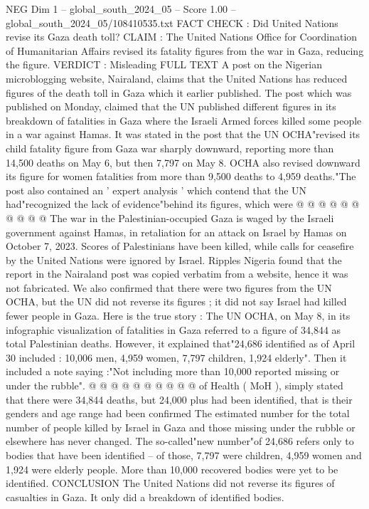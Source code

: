 \begin{textsample}{NEG Dim 1 – global\_south\_2024\_05 – Score 1.00 – global\_south\_2024\_05/108410535.txt}  \label{ex:f1_neg_216}
FACT CHECK : Did United Nations revise its Gaza death toll?
CLAIM : The United Nations Office for Coordination of Humanitarian Affairs revised its fatality figures from the war in Gaza, reducing the figure.
VERDICT : Misleading FULL TEXT A post on the Nigerian microblogging website, Nairaland, claims that the United Nations has reduced figures of the death toll in Gaza which it earlier published.
The post which was published on Monday, claimed that the UN published different figures in its breakdown of fatalities in Gaza where the Israeli Armed forces killed some people in a war against Hamas.
It was stated in the post that the UN OCHA"revised its child fatality figure from Gaza war sharply downward, reporting more than 14,500 deaths on May 6, but then 7,797 on May 8.
OCHA also revised downward its figure for women fatalities from more than 9,500 deaths to 4,959 deaths."The post also contained an ' expert analysis ' which contend that the UN had"recognized the lack of evidence"behind its figures, which were @ @ @ @ @ @ @ @ @ @ The war in the Palestinian-occupied Gaza is waged by the Israeli government against Hamas, in retaliation for an attack on Israel by Hamas on October 7, 2023.
Scores of Palestinians have been killed, while calls for ceasefire by the United Nations were ignored by Israel.
Ripples Nigeria found that the report in the Nairaland post was copied verbatim from a website, hence it was not fabricated.
We also confirmed that there were two figures from the UN OCHA, but the UN did not reverse its figures ; it did not say Israel had killed fewer people in Gaza.
Here is the true story : The UN OCHA, on May 8, in its infographic visualization of fatalities in Gaza referred to a figure of 34,844 as total Palestinian deaths.
However, it explained that"24,686 identified as of April 30 included : 10,006 men, 4,959 women, 7,797 children, 1,924 elderly".
Then it included a note saying :"Not including more than 10,000 reported missing or under the rubble". @ @ @ @ @ @ @ @ @ @ of Health ( MoH ), simply stated that there were 34,844 deaths, but 24,000 plus had been identified, that is their genders and age range had been confirmed The estimated number for the total number of people killed by Israel in Gaza and those missing under the rubble or elsewhere has never changed.
The so-called"new number"of 24,686 refers only to bodies that have been identified -- of those, 7,797 were children, 4,959 women and 1,924 were elderly people.
More than 10,000 recovered bodies were yet to be identified.
CONCLUSION The United Nations did not reverse its figures of casualties in Gaza.
It only did a breakdown of identified bodies.

\end{textsample}
